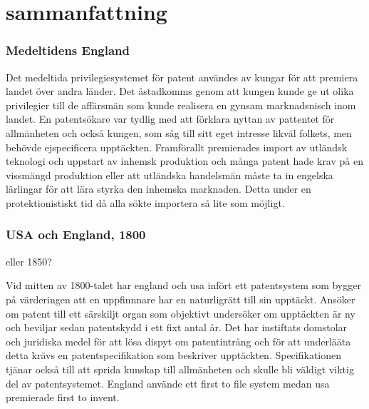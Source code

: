 \section{sammanfattning}
\subsubsection{Medeltidens England}

Det medeltida privilegiesystemet för patent användes av kungar för att premiera landet över andra länder. Det åstadkomms genom att kungen kunde ge ut olika privilegier till de affärsmän som kunde realisera en gynsam marknadsnisch inom landet. En patentsökare var tydlig med att förklara nyttan av pattentet för allmänheten och också kungen, som såg till sitt eget intresse likväl folkets, men behövde ejspecificera upptäckten. Framförallt premierades import av utländsk teknologi och uppstart av inhemsk produktion och många patent hade krav på en vissmängd produktion eller att utländska handelsmän måste ta in engelska lärlingar för att lära styrka den inhemska marknaden. Detta under en protektionistiskt tid då alla sökte importera så lite som möjligt.

\subsubsection{USA och England, 1800} eller 1850?

Vid mitten av 1800-talet har england och usa infört ett patentsystem som bygger på värderingen att en uppfinnnare har en naturligrätt till sin upptäckt. Ansöker om patent till ett särskiljt organ som objektivt undersöker om upptäckten är ny och beviljar sedan patentskydd i ett fixt antal år. Det har instiftats domstolar och juridiska medel för att lösa dispyt om patentintrång och för att underlääta detta krävs en patentspecifikation som beskriver upptäckten. Specifikationen tjänar också till att sprida kunskap till allmänheten och skulle bli väldigt viktig del av patentsystemet. England använde ett first to file system medan usa premierade first to invent.

